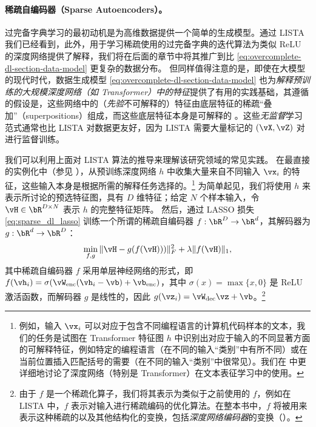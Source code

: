 \documentclass[../../book-main_zh.tex]{subfiles}
\begin{document}
    \paragraph{稀疏自编码器（Sparse Autoencoders）。}
    过完备字典学习的最初动机是为高维数据提供一个简单的生成模型。通过 LISTA
    我们已经看到，此外，用于学习稀疏使用的过完备字典的迭代算法为类似 ReLU 的深度网络提供了解释，我们将在后面的章节中将其推广到比
    \eqref{eq:overcomplete-dl-section-data-model} 更复杂的数据分布。
    但同样值得注意的是，即使在大模型的现代时代，数据生成模型
    \eqref{eq:overcomplete-dl-section-data-model}
    也为\textit{解释预训练的大规模深度网络（如
    Transformer）中的特征}提供了有用的实践基础，其遵循的假设是，这些网络中的（\textit{先验}不可解释的）特征由底层特征的稀疏“叠加”（superpositions）组成，而这些底层特征本身是可解释的
    \cite{elhage2022superposition}。这些\textit{无监督}学习范式通常也比 LISTA
    对数据更友好，因为 LISTA 需要大量标记的 $(\vX, \vZ)$ 对进行监督训练。

    我们可以利用上面对 LISTA 算法的推导来理解该研究领域的常见实践。
    在最直接的实例化中（参见 \citep{huben2024sparse,
    gao2025scaling}），从预训练深度网络 $h$ 中收集大量来自不同输入 $\vx_i$
    的特征，这些输入本身是根据所需的解释任务选择的。\footnote{例如，输入 $\vx_i$
        可以对应于包含不同编程语言的计算机代码样本的文本，我们的任务是试图在 Transformer 特征图 $h$
        中识别出对应于输入的不同显著方面的可解释特征，例如特定的编程语言（在不同的输入“类别”中有所不同）或在当前位置插入匹配括号的需要（在不同的输入“类别”中很常见）。我们在
     中更详细地讨论了深度网络（特别是 Transformer）在文本表征学习中的使用。}
    为简单起见，我们将使用 $h$ 来表示所讨论的预选特征图，具有 $D$ 维特征；给定 $N$ 个样本输入，令 $\vH \in \bR^{D
    \times N}$ 表示 $h$ 的完整特征矩阵。
    然后，通过 LASSO 损失 \eqref{eq:sparse_dl_lasso} 训练一个所谓的稀疏自编码器 $f :
    \bR^D \to \bR^d$，其解码器为 $g : \bR^d \to
    \bR^D$：
    \begin{equation}\label{eq:sae-loss}
    \min_{f, g} \| \vH - g(f(\vH))) \|_F^2 + \lambda \|f(\vH)\|_1 ,
\end{equation}
其中稀疏自编码器 $f$ 采用单层神经网络的形式，即 $f(\vh_i) = \sigma(\vW_{\mathrm{enc}}(\vh_i - \vb)
+ \vb_{\mathrm{enc}})$，其中 $\sigma(x) = \max \{x, 0\}$ 是 ReLU
激活函数，而解码器 $g$ 是线性的，因此 $g(\vz_i)
= \vW_{\mathrm{dec}}\vz + \vb$。\footnote{由于 \(f\)
    是一个稀疏化算子，我们将其表示为类似于之前使用的 \(f\)，例如在 LISTA 中，\(f\)
    表示对输入进行稀疏编码的优化算法。在整本书中，\(f\)
将被用来表示这种稀疏的以及其他结构化的变换，包括\textit{深度网络编码器}的变换（）。}
\end{document}
